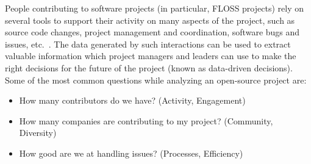 \documentclass[a4paper, 12pt]{book}
\begin{document}


People contributing to software projects (in particular, FLOSS projects) rely on several tools to support their activity on many aspects of the project, such as source code changes, project management and coordination, software bugs and issues, etc.~\cite{dabbish-et-al:socialcoding-github12}. The data generated by such interactions can be used to extract valuable information which project managers and leaders can use to make the right decisions for the future of the project (known as data-driven decisions). Some of the most common questions while analyzing an open-source project are:

\begin{itemize}
    \item How many contributors do we have? (Activity, Engagement)
    \item How many companies are contributing to my project? (Community, Diversity)
    \item How good are we at handling issues? (Processes, Efficiency) 
\end{itemize}
\end{document}
